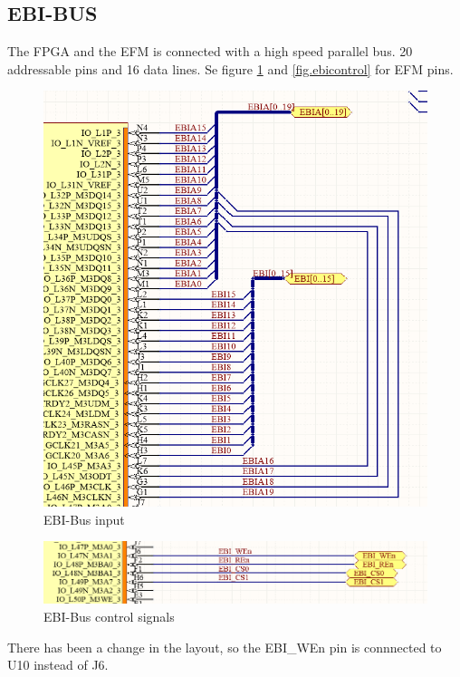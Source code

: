 \subsection{EBI-BUS}
The FPGA and the EFM is connected with a high speed parallel bus. 20 addressable pins and 16 data lines.  Se figure \ref{fig:ebibus} and \ref{fig.ebicontrol} for EFM pins.


\begin{figure}
    \includegraphics[width=\linewidth]{img/EBI-bus.png}
    \caption{EBI-Bus input}
    \label{fig:ebibus}
\end{figure}

\begin{figure}
    \includegraphics[width=\linewidth]{img/EBI-bus_2.png}
    \caption{EBI-Bus control signals}
    \label{fig:ebicontrol}
\end{figure}

There has been a change in the layout, so the EBI\_WEn pin is connnected to U10 instead of J6.
